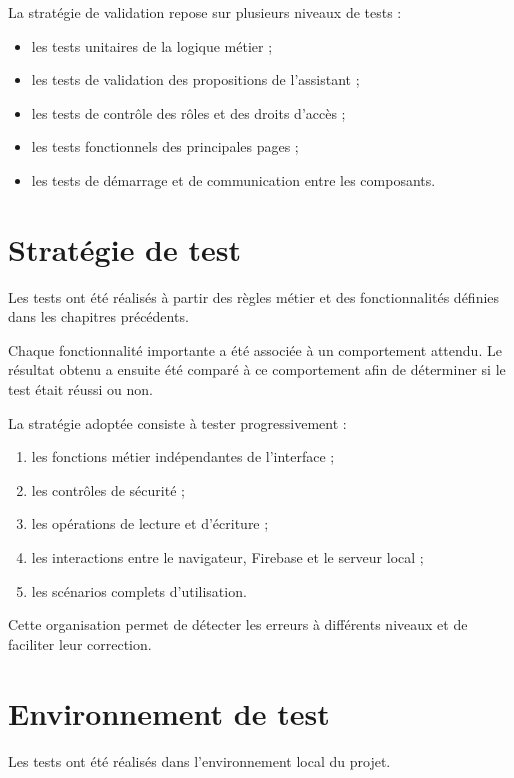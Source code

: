 \documentclass{rapportENSIAS}
\begin{document}
La stratégie de validation repose sur plusieurs niveaux de tests :

\begin{itemize}
    \item les tests unitaires de la logique métier ;
    \item les tests de validation des propositions de l’assistant ;
    \item les tests de contrôle des rôles et des droits d’accès ;
    \item les tests fonctionnels des principales pages ;
    \item les tests de démarrage et de communication entre les composants.
\end{itemize}

\section{Stratégie de test}

Les tests ont été réalisés à partir des règles métier et des fonctionnalités définies dans les chapitres précédents.

Chaque fonctionnalité importante a été associée à un comportement attendu. Le résultat obtenu a ensuite été comparé à ce comportement afin de déterminer si le test était réussi ou non.

La stratégie adoptée consiste à tester progressivement :

\begin{enumerate}
    \item les fonctions métier indépendantes de l’interface ;
    \item les contrôles de sécurité ;
    \item les opérations de lecture et d’écriture ;
    \item les interactions entre le navigateur, Firebase et le serveur local ;
    \item les scénarios complets d’utilisation.
\end{enumerate}

Cette organisation permet de détecter les erreurs à différents niveaux et de faciliter leur correction.

\section{Environnement de test}

Les tests ont été réalisés dans l’environnement local du projet.
\end{document}

